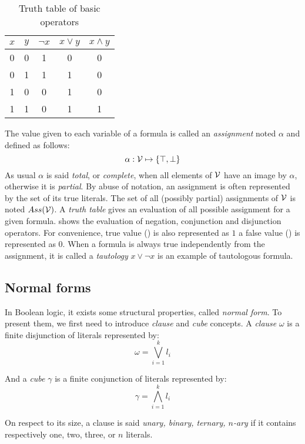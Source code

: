 \begin{table}[!htbp]
 \centering
 \begin{tabular}{cc|ccc}
  $x$ & $y$ & $\neg x$ & $x \lor y$ & $x \land y$ \\
  \toprule
  0 & 0 & 1 & 0 & 0 \\
  \midrule
  0 & 1 & 1 & 1 & 0 \\
  \midrule
  1 & 0 & 0 & 1 & 0 \\
  \midrule
  1 & 1 & 0 & 1 & 1 \\
  \bottomrule
 \end{tabular}
 \caption{Truth table of basic operators}
 \label{tab:truthtable}
\end{table}
The value given to each variable of a formula is called an \emph{assignment} noted $\alpha$ and defined as follows:
 $$\alpha: \mathcal{V} \mapsto \{ \top, \bot \}$$
 As usual $\alpha$ is said \emph{total}, or \emph{complete}, when all elements of $\mathcal{V}$ have an image by
$\alpha$, otherwise it is \emph{partial}. By abuse of notation, an assignment is
often represented by the set of its true literals.  The set of all (possibly
partial) assignments of $\mathcal{V}$ is noted $Ass(\mathcal{V})$.
A \emph{truth table} gives an evaluation of all possible assignment for a given formula.
 shows the evaluation of negation, conjunction and disjunction operators.
For convenience, true value (\true) is also represented as $1$ a false value (\false) is represented as $0$.
When a formula is always true independently from the assignment, it is called a \emph{tautology} $x \lor \neg x$ is 
an example of tautologous formula.

\subsection{Normal forms}
In Boolean logic, it exists some structural properties, called \emph{normal form}.
To present them, we first need to introduce \emph{clause} and \emph{cube} concepts.
A \emph{clause} $\omega$ is a finite disjunction of literals represented by:
 $$\omega = \bigvee_{i=1}^k l_i$$
 
 
And a \emph{cube} $\gamma$ is a finite conjunction of literals represented by:
$$\gamma = \bigwedge_{i=1}^k l_i$$

On respect to its size, a clause is said \emph{unary, binary, ternary, $n$-ary} if it contains respectively one, two, three, or $n$ literals.

